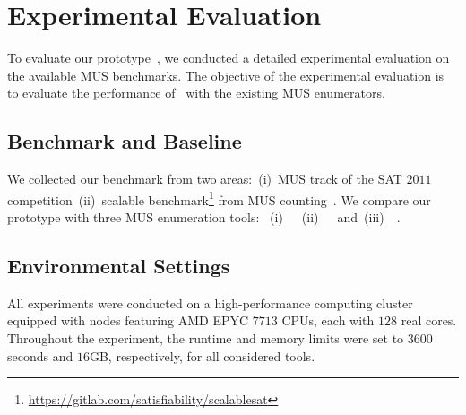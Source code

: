 \section{Experimental Evaluation}
\label{section:experiment}
To evaluate our prototype~\toolname, we conducted a detailed experimental evaluation on the available MUS benchmarks.
The objective of the experimental evaluation is to evaluate the performance of \toolname~with the existing MUS enumerators.

\subsection{Benchmark and Baseline}
We collected our benchmark from two areas:~(i)~MUS track of the SAT $2011$ competition~(ii)~scalable benchmark\footnote{\url{https://gitlab.com/satisfiability/scalablesat}} 
from MUS counting~\cite{BM2020}. We compare our prototype with three MUS enumeration tools: 
~(i)~\marco~\cite{LPMM2016}~(ii)~\unimus~\cite{BC2020}~and~(iii)~\remus~\cite{BCB2018}.

\subsection{Environmental Settings}
All experiments were conducted on a high-performance computing cluster equipped with nodes featuring AMD EPYC $7713$ CPUs, each with $128$ real cores. 
Throughout the experiment, the runtime and memory limits were set to $3600$ seconds and $16$GB, respectively, for all considered tools.

